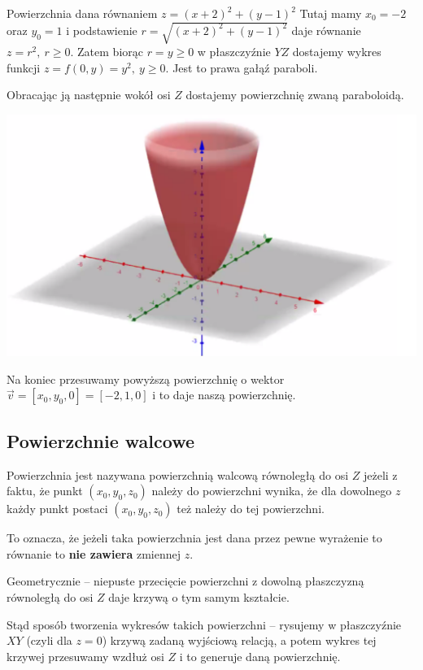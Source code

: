 \begin{przyklad}
Powierzchnia dana równaniem $ z = (x+2)^2 + (y-1)^2 $
Tutaj mamy $ x_0 = -2 $ oraz $ y_0 = 1 $ i podstawienie $ r = \sqrt{(x+2)^2 + (y-1)^2} $ daje równanie $ z = r^2, \ r \geq 0 $.
Zatem biorąc $ r = y \geq 0 $ w płaszczyźnie $YZ$ dostajemy wykres funkcji $ z = f(0, y) = y^2, \ y \geq 0 $. Jest to prawa gałąź
paraboli.

Obracając ją następnie wokół osi $Z$ dostajemy powierzchnię zwaną paraboloidą.

\begin{center}
\includegraphics[scale=0.6]{img/paraboloida.png}
\end{center}

Na koniec przesuwamy powyższą powierzchnię o wektor $ \vec{v} = [x_0, y_0, 0] = [-2, 1, 0] $ i to daje naszą powierzchnię.
\end{przyklad}

\subsection{Powierzchnie walcowe}

Powierzchnia jest nazywana powierzchnią walcową równoległą do osi $Z$ jeżeli z faktu, że punkt $ (x_0,y_0,z_0) $
należy do powierzchni wynika, że dla dowolnego $z$ każdy punkt postaci $(x_0, y_0, z_0)$ też należy do tej powierzchni.

To oznacza, że jeżeli taka powierzchnia jest dana przez pewne wyrażenie to równanie to \textbf{nie zawiera} zmiennej $z$.

Geometrycznie -- niepuste przecięcie powierzchni z dowolną płaszczyzną równoległą do osi $Z$ daje krzywą o tym samym kształcie.

Stąd sposób tworzenia wykresów takich powierzchni -- rysujemy w płaszczyźnie $XY$ (czyli dla $z=0$) krzywą zadaną wyjściową relacją,
a potem wykres tej krzywej przesuwamy wzdłuż osi $Z$ i to generuje daną powierzchnię. \\ 

